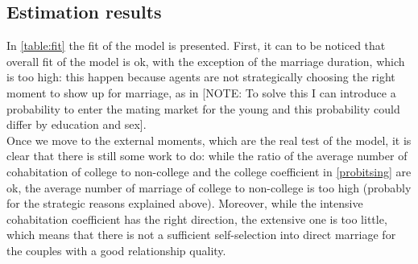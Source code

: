 \documentclass[12pt]{article}
\begin{document}
\subsection{Estimation results}
In \autoref{table:fit} the fit of the model is presented. First, it can to be noticed that overall fit of the model is ok, with the exception of the marriage duration, which is too high: this happen because agents are not strategically choosing the right moment to show up for marriage, as in \citet{bergstrom1993} [NOTE: To solve this I can introduce a probability to enter the mating market for the young and this probability could differ by education and sex].\\
Once we move to the external moments, which are the real test of the model, it is clear that there is still some work to do: while the ratio of the average number of cohabitation of college to non-college and the college coefficient in \autoref{probitsing} are ok, the average number of marriage of college to non-college is too high (probably for the strategic reasons explained above). Moreover, while the intensive cohabitation coefficient has the right direction, the extensive one is too little, which means that there is not a sufficient self-selection into direct marriage for the couples with a good relationship quality.
\end{document}

